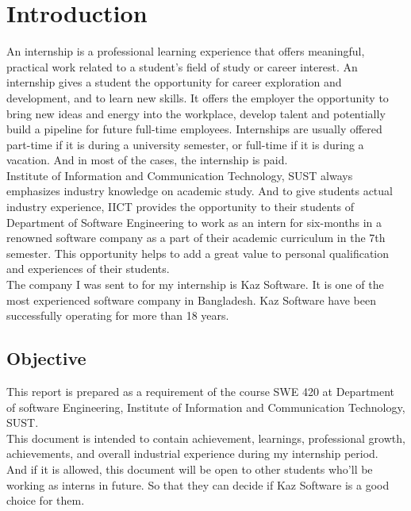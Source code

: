 \chapter{Introduction}

An internship is a professional learning experience that offers meaningful, practical work related to a student’s field of study or career interest.
An internship gives a student the opportunity for career exploration and development, and to learn new skills.
It offers the employer the opportunity to bring new ideas and energy into the workplace, develop talent and potentially build a pipeline for future full-time employees.
Internships are usually offered part-time if it is during a university semester, or full-time if it is during a vacation.
And in most of the cases, the internship is paid. \\

Institute of Information and Communication Technology, SUST always emphasizes industry knowledge on academic study. 
And to give students actual industry experience, IICT provides the opportunity to their students of Department of Software Engineering to work as an intern for six-months in a renowned software company as a part of their academic curriculum in the 7th semester.
This opportunity helps to add a great value to personal qualification and experiences of their students. \\

The company I was sent to for my internship is Kaz Software. It is one of the most experienced software company in Bangladesh. Kaz Software have been successfully operating for more than 18 years.

\section{Objective}

This report is prepared as a requirement of the course SWE 420 at Department of software Engineering, Institute of Information and Communication Technology, SUST. \\

This document is intended to contain achievement, learnings, professional growth, achievements, and overall industrial experience during my internship period. \\

And if it is allowed, this document will be open to other students who'll be working as interns in future.
So that they can decide if Kaz Software is a good choice for them.

